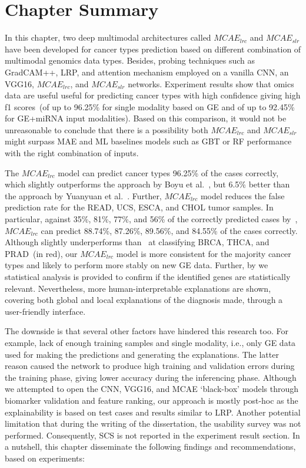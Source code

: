 \section{Chapter Summary}\label{chapter_5:conclusion}
In this chapter, two deep multimodal architectures called $MCAE_{lrc}$ and $MCAE_{slr}$ have been developed for cancer types prediction based on different combination of multimodal genomics data types. Besides, probing techniques such as GradCAM++, LRP, and attention mechanism employed on a vanilla CNN, an VGG16, $MCAE_{lrc}$, and $MCAE_{slr}$ networks. Experiment results show that omics data are useful useful for predicting cancer types with high confidence giving high f1 scores~(of up to 96.25\% for single modality based on GE and of up to 92.45\% for GE+miRNA input modalities). Based on this comparison, it would not be unreasonable to conclude that there is a possibility both $MCAE_{lrc}$ and $MCAE_{slr}$ might surpass MAE and ML baselines models such as GBT or RF performance with the right combination of inputs. 

\hspace*{3.5mm} The $MCAE_{lrc}$ model can predict cancer types 96.25\% of the cases correctly, which slightly outperforms the approach by Boyu et al.~\cite{lyu2018deep}, but 6.5\% better than the approach by Yuanyuan et al.~\cite{li2017comprehensive}. Further, $MCAE_{lrc}$ model reduces the false prediction rate for the READ, UCS, ESCA, and CHOL tumor samples. In particular, against 35\%, 81\%, 77\%, and 56\% of the correctly predicted cases by~\cite{lyu2018deep}, $MCAE_{lrc}$ can predict 88.74\%, 87.26\%, 89.56\%, and 84.55\% of the cases correctly. Although slightly underperforms than~\cite{lyu2018deep} at classifying BRCA, THCA, and PRAD~(in red), our $MCAE_{lrc}$ model is more consistent for the majority cancer types and likely to perform more stably on new GE data. Further, by we statistical analysis is provided to confirm if the identified genes are statistically relevant. Nevertheless, more human-interpretable explanations are shown, covering both global and local explanations of the diagnosis made, through a user-friendly interface. 

\hspace*{3.5mm} The downside is that several other factors have hindered this research too. For example, lack of enough training samples and single modality, i.e., only GE data used for making the predictions and generating the explanations. The latter reason caused the network to produce high training and validation errors during the training phase, giving lower accuracy during the inferencing phase. Although we attempted to open the CNN, VGG16, and MCAE `black-box' models through biomarker validation and feature ranking, our approach is mostly post-hoc as the explainability is based on test cases and results similar to LRP. Another potential limitation that during the writing of the dissertation, the usability survey was not performed. Consequently, SCS is not reported in the experiment result section. %
In a nutshell, this chapter disseminate the following findings and recommendations, based on experiments:  

